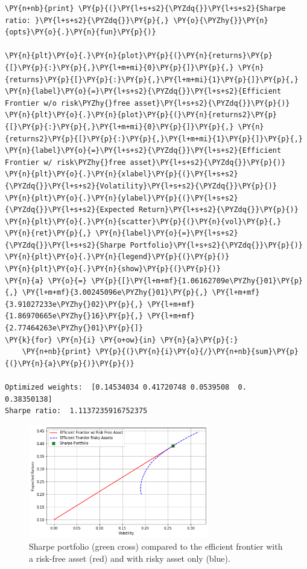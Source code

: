 \begin{tcolorbox}[breakable, size=fbox, boxrule=1pt, pad at break*=1mm,colback=cellbackground, colframe=cellborder]
\begin{Verbatim}[commandchars=\\\{\}]
\PY{n+nb}{print} \PY{p}{(}\PY{l+s+s2}{\PYZdq{}}\PY{l+s+s2}{Sharpe ratio: }\PY{l+s+s2}{\PYZdq{}}\PY{p}{,} \PY{o}{\PYZhy{}}\PY{n}{opts}\PY{o}{.}\PY{n}{fun}\PY{p}{)}

\PY{n}{plt}\PY{o}{.}\PY{n}{plot}\PY{p}{(}\PY{n}{returns}\PY{p}{[}\PY{p}{:}\PY{p}{,}\PY{l+m+mi}{0}\PY{p}{]}\PY{p}{,} \PY{n}{returns}\PY{p}{[}\PY{p}{:}\PY{p}{,}\PY{l+m+mi}{1}\PY{p}{]}\PY{p}{,} \PY{n}{label}\PY{o}{=}\PY{l+s+s2}{\PYZdq{}}\PY{l+s+s2}{Efficient Frontier w/o risk\PYZhy{}free asset}\PY{l+s+s2}{\PYZdq{}}\PY{p}{)}
\PY{n}{plt}\PY{o}{.}\PY{n}{plot}\PY{p}{(}\PY{n}{returns2}\PY{p}{[}\PY{p}{:}\PY{p}{,}\PY{l+m+mi}{0}\PY{p}{]}\PY{p}{,} \PY{n}{returns2}\PY{p}{[}\PY{p}{:}\PY{p}{,}\PY{l+m+mi}{1}\PY{p}{]}\PY{p}{,} \PY{n}{label}\PY{o}{=}\PY{l+s+s2}{\PYZdq{}}\PY{l+s+s2}{Efficient Frontier w/ risk\PYZhy{}free asset}\PY{l+s+s2}{\PYZdq{}}\PY{p}{)}
\PY{n}{plt}\PY{o}{.}\PY{n}{xlabel}\PY{p}{(}\PY{l+s+s2}{\PYZdq{}}\PY{l+s+s2}{Volatility}\PY{l+s+s2}{\PYZdq{}}\PY{p}{)}
\PY{n}{plt}\PY{o}{.}\PY{n}{ylabel}\PY{p}{(}\PY{l+s+s2}{\PYZdq{}}\PY{l+s+s2}{Expected Return}\PY{l+s+s2}{\PYZdq{}}\PY{p}{)}
\PY{n}{plt}\PY{o}{.}\PY{n}{scatter}\PY{p}{(}\PY{n}{vol}\PY{p}{,} \PY{n}{ret}\PY{p}{,} \PY{n}{label}\PY{o}{=}\PY{l+s+s2}{\PYZdq{}}\PY{l+s+s2}{Sharpe Portfolio}\PY{l+s+s2}{\PYZdq{}}\PY{p}{)}
\PY{n}{plt}\PY{o}{.}\PY{n}{legend}\PY{p}{(}\PY{p}{)}
\PY{n}{plt}\PY{o}{.}\PY{n}{show}\PY{p}{(}\PY{p}{)}
\PY{n}{a} \PY{o}{=} \PY{p}{[}\PY{l+m+mf}{1.06162709e\PYZhy{}01}\PY{p}{,} \PY{l+m+mf}{3.00245096e\PYZhy{}01}\PY{p}{,} \PY{l+m+mf}{3.91027233e\PYZhy{}02}\PY{p}{,} \PY{l+m+mf}{1.86970665e\PYZhy{}16}\PY{p}{,} \PY{l+m+mf}{2.77464263e\PYZhy{}01}\PY{p}{]}
\PY{k}{for} \PY{n}{i} \PY{o+ow}{in} \PY{n}{a}\PY{p}{:}
    \PY{n+nb}{print} \PY{p}{(}\PY{n}{i}\PY{o}{/}\PY{n+nb}{sum}\PY{p}{(}\PY{n}{a}\PY{p}{)}\PY{p}{)}

Optimized weights:  [0.14534034 0.41720748 0.0539508  0.         0.38350138]
Sharpe ratio:  1.1137235916752375
\end{Verbatim}
\end{tcolorbox}

\begin{figure}[htb]
\centering
\includegraphics[width=0.7\textwidth]{figures/sharpe_ratio.png}
   \caption{Sharpe portfolio (green cross) compared to the efficient frontier with a risk-free asset (red) and with risky asset only (blue).}
\label{fig:sharpe_ratio}
\end{figure}
    
